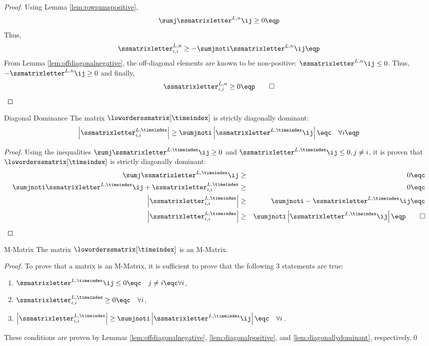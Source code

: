 \begin{proof}
Using Lemma \ref{lem:rowsumspositive},
\[
  \sumj \ssmatrixletter^{L,n}\ij \ge 0 \eqp
\]
Thus,
\[
  \ssmatrixletter^{L,n}_{i,i} \ge -\sumjnoti \ssmatrixletter^{L,n}\ij \eqp
\]
From Lemma \ref{lem:offdiagonalnegative}, the off-diagonal elements are known
to be non-positive: $\ssmatrixletter^{L,n}\ij \leq 0$. Thus,
$-\ssmatrixletter^{L,n}\ij \geq 0$ and finally,
\[
  \ssmatrixletter^{L,n}_{i,i} \ge 0 \eqp \qed
\]
\end{proof}
\begin{lemma}{Diagonal Dominance}
   The matrix $\loworderssmatrix[\timeindex]$ is strictly diagonally dominant:
   \[
     \left|\ssmatrixletter^{L,\timeindex}_{i,i}\right|
     \ge \sumjnoti \left|\ssmatrixletter^{L,\timeindex}\ij\right|
     \eqc \quad \forall i\eqp
   \]
\end{lemma}
\begin{proof}
Using the inequalities $\sumj \ssmatrixletter^{L,\timeindex}\ij \ge 0$ and
$\ssmatrixletter^{L,\timeindex}\ij\le 0, j\ne i$, it is proven that
$\loworderssmatrix[\timeindex]$ is strictly diagonally dominant:
\begin{eqnarray*}
  \sumj     \ssmatrixletter^{L,\timeindex}\ij       & \ge & 0 \eqc\\
  \sumjnoti \ssmatrixletter^{L,\timeindex}\ij
    + \ssmatrixletter^{L,\timeindex}_{i,i} & \ge & 0 \eqc\\
  \left|\ssmatrixletter^{L,\timeindex}_{i,i}\right| & \ge &
    \sumjnoti -\ssmatrixletter^{L,\timeindex}\ij
    \eqc\\
  \left|\ssmatrixletter^{L,\timeindex}_{i,i}\right| & \ge
    & \sumjnoti \left|\ssmatrixletter^{L,\timeindex}\ij\right| \eqp \qed
\end{eqnarray*}
\end{proof}
\begin{theorem}{M-Matrix}
  The matrix $\loworderssmatrix[\timeindex]$ is an M-Matrix.
\end{theorem}
\begin{proof}
To prove that a matrix is an M-Matrix, it is sufficient to prove that
the following 3 statements are true:
\begin{enumerate}
\item $\ssmatrixletter^{L,\timeindex}\ij\le 0
      \eqc \quad j\ne i \eqc \forall i$,
\item $\ssmatrixletter^{L,\timeindex}_{i,i}\ge 0 \eqc \quad \forall i$,
\item $\left|\ssmatrixletter^{L,\timeindex}_{i,i}\right|
      \ge \sumjnoti \left|\ssmatrixletter^{L,\timeindex}\ij\right|
      \eqc \quad \forall i$.
\end{enumerate}
These conditions are proven by Lemmas \ref{lem:offdiagonalnegative},
\ref{lem:diagonalpositive}, and \ref{lem:diagonallydominant}, respectively.\qed
\end{proof}
